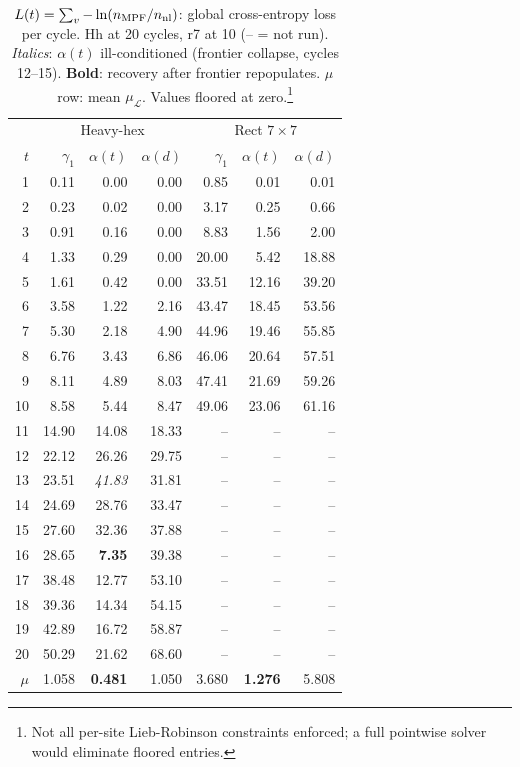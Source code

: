 \documentclass[letterpaper]{article}
\begin{document}
\begin{table}[t]
\centering
\setlength{\tabcolsep}{3pt}
\scriptsize
\begin{tabular}{r|rrr|rrr}
\toprule
 & \multicolumn{3}{c|}{Heavy-hex} & \multicolumn{3}{c}{Rect $7\times7$} \\
$t$ & $\gamma_1$ & $\alpha(t)$ & $\alpha(d)$ & $\gamma_1$ & $\alpha(t)$ & $\alpha(d)$ \\
\midrule
 1 &  0.11 &  0.00 &  0.00 &  0.85 &  0.01 &  0.01 \\
 2 &  0.23 &  0.02 &  0.00 &  3.17 &  0.25 &  0.66 \\
 3 &  0.91 &  0.16 &  0.00 &  8.83 &  1.56 &  2.00 \\
 4 &  1.33 &  0.29 &  0.00 & 20.00 &  5.42 & 18.88 \\
 5 &  1.61 &  0.42 &  0.00 & 33.51 & 12.16 & 39.20 \\
 6 &  3.58 &  1.22 &  2.16 & 43.47 & 18.45 & 53.56 \\
 7 &  5.30 &  2.18 &  4.90 & 44.96 & 19.46 & 55.85 \\
 8 &  6.76 &  3.43 &  6.86 & 46.06 & 20.64 & 57.51 \\
 9 &  8.11 &  4.89 &  8.03 & 47.41 & 21.69 & 59.26 \\
10 &  8.58 &  5.44 &  8.47 & 49.06 & 23.06 & 61.16 \\
11 & 14.90 & 14.08 & 18.33 & -- & -- & -- \\
12 & 22.12 & 26.26 & 29.75 & -- & -- & -- \\
13 & 23.51 & \textit{41.83} & 31.81 & -- & -- & -- \\
14 & 24.69 & 28.76 & 33.47 & -- & -- & -- \\
15 & 27.60 & 32.36 & 37.88 & -- & -- & -- \\
16 & 28.65 & \textbf{7.35} & 39.38 & -- & -- & -- \\
17 & 38.48 & 12.77 & 53.10 & -- & -- & -- \\
18 & 39.36 & 14.34 & 54.15 & -- & -- & -- \\
19 & 42.89 & 16.72 & 58.87 & -- & -- & -- \\
20 & 50.29 & 21.62 & 68.60 & -- & -- & -- \\
\midrule
$\mu$ & 1.058 & \textbf{0.481} & 1.050 & 3.680 & \textbf{1.276} & 5.808 \\
\bottomrule
\end{tabular}
\caption{$L(t) = \sum_v -\ln(n_{\rm MPF}/n_{\rm nl})$: global cross-entropy loss per cycle.
Hh at 20 cycles, r7 at 10 (-- = not run).
\textit{Italics}: $\alpha(t)$ ill-conditioned (frontier collapse, cycles 12--15).
\textbf{Bold}: recovery after frontier repopulates.
$\mu$ row: mean $\mu_\mathcal{L}$. Values floored at zero.\footnote{Not all
per-site Lieb-Robinson constraints enforced; a full pointwise solver would
eliminate floored entries.}}
\label{tab:lt}
\end{table}
\end{document}
